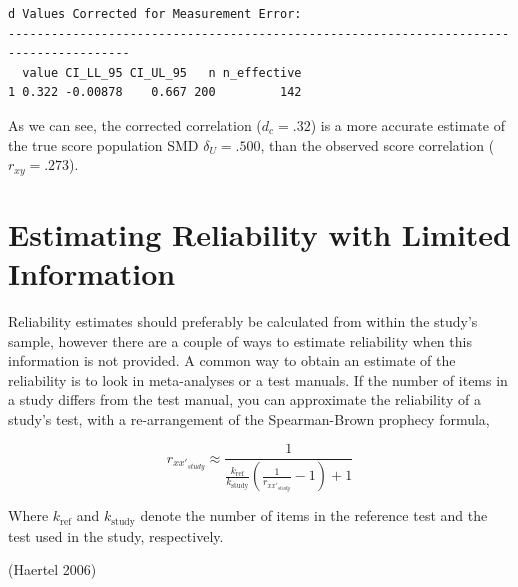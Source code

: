 \documentclass[
  letterpaper,
  DIV=11,
  numbers=noendperiod]{scrreprt}
\newenvironment{Shaded}{\begin{snugshade}}{\end{snugshade}}
\newcommand{\AttributeTok}[1]{\textcolor[rgb]{0.40,0.45,0.13}{#1}}
\newcommand{\CommentTok}[1]{\textcolor[rgb]{0.37,0.37,0.37}{#1}}
\newcommand{\DecValTok}[1]{\textcolor[rgb]{0.68,0.00,0.00}{#1}}
\newcommand{\FunctionTok}[1]{\textcolor[rgb]{0.28,0.35,0.67}{#1}}
\newcommand{\NormalTok}[1]{\textcolor[rgb]{0.00,0.23,0.31}{#1}}
\newcommand{\OtherTok}[1]{\textcolor[rgb]{0.00,0.23,0.31}{#1}}
\newcommand{\SpecialCharTok}[1]{\textcolor[rgb]{0.37,0.37,0.37}{#1}}
\begin{document}
\begin{Shaded}
\end{Shaded}

\begin{verbatim}
d Values Corrected for Measurement Error:
---------------------------------------------------------------------------------------
  value CI_LL_95 CI_UL_95   n n_effective
1 0.322 -0.00878    0.667 200         142
\end{verbatim}

As we can see, the corrected correlation (\(d_c = .32\)) is a more
accurate estimate of the true score population SMD \(\delta_U = .500\),
than the observed score correlation (\(r_{xy}=.273\)).

\hypertarget{sec-lim-information}{%
\section{Estimating Reliability with Limited
Information}\label{sec-lim-information}}

Reliability estimates should preferably be calculated from within the
study's sample, however there are a couple of ways to estimate
reliability when this information is not provided. A common way to
obtain an estimate of the reliability is to look in meta-analyses or a
test manuals. If the number of items in a study differs from the test
manual, you can approximate the reliability of a study's test, with a
re-arrangement of the Spearman-Brown prophecy formula,

\[
r_{xx'_{study}} \approx \frac{1}{\frac{k_{\text{ref}}}{k_{\text{study}}} \left(\frac{1}{r_{xx'_{study}}} - 1\right) + 1}
\]

Where \(k_{\text{ref}}\) and \(k_{\text{study}}\) denote the number of
items in the reference test and the test used in the study,
respectively.

(Haertel 2006)
\end{document}
